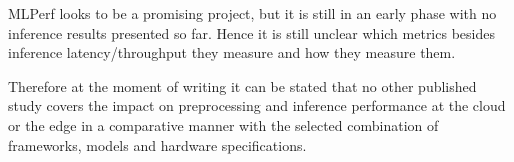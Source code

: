 MLPerf looks to be a promising project, but it is still in an early phase with no inference results presented so far. Hence it is still unclear which metrics besides inference latency/throughput they measure and how they measure them.

Therefore at the moment of writing it can be stated that no other published study covers the impact on preprocessing and inference performance at the cloud or the edge in a comparative manner with the selected combination of frameworks, models and hardware specifications. 



 \endinput 
